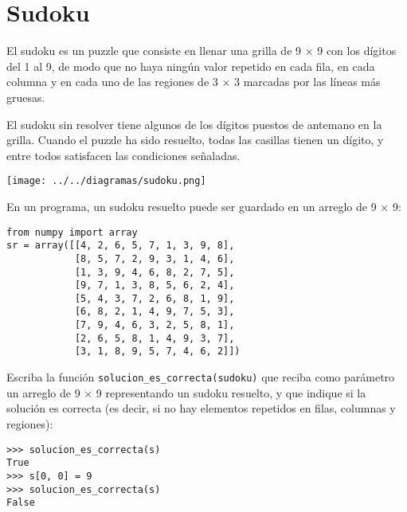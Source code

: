 \section{Sudoku}

El sudoku es un puzzle que consiste en llenar una grilla de 9 × 9 con
los dígitos del 1 al 9, de modo que no haya ningún valor repetido en
cada fila, en cada columna y en cada uno de las regiones de 3 × 3
marcadas por las líneas más gruesas.

El sudoku sin resolver tiene algunos de los dígitos puestos de antemano
en la grilla. Cuando el puzzle ha sido resuelto, todas las casillas
tienen un dígito, y entre todos satisfacen las condiciones señaladas.

\texttt{[image: ../../diagramas/sudoku.png]}

En un programa, un sudoku resuelto puede ser guardado en un arreglo de 9
× 9:

\begin{lstlisting}
from numpy import array
sr = array([[4, 2, 6, 5, 7, 1, 3, 9, 8],
            [8, 5, 7, 2, 9, 3, 1, 4, 6],
            [1, 3, 9, 4, 6, 8, 2, 7, 5],
            [9, 7, 1, 3, 8, 5, 6, 2, 4],
            [5, 4, 3, 7, 2, 6, 8, 1, 9],
            [6, 8, 2, 1, 4, 9, 7, 5, 3],
            [7, 9, 4, 6, 3, 2, 5, 8, 1],
            [2, 6, 5, 8, 1, 4, 9, 3, 7],
            [3, 1, 8, 9, 5, 7, 4, 6, 2]])
\end{lstlisting}

Escriba la función \lstinline!solucion_es_correcta(sudoku)! que reciba
como parámetro un arreglo de 9 × 9 representando un sudoku resuelto, y
que indique si la solución es correcta (es decir, si no hay elementos
repetidos en filas, columnas y regiones):

\begin{lstlisting}
>>> solucion_es_correcta(s)
True
>>> s[0, 0] = 9
>>> solucion_es_correcta(s)
False
\end{lstlisting}

